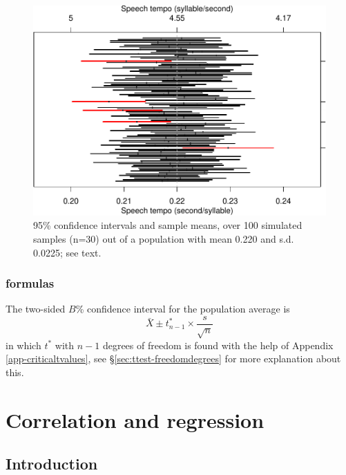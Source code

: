 \documentclass[
]{book}
\begin{document}
\begin{figure}
\centering
\includegraphics{QMS-EN_files/figure-latex/tempo95CIs-1.pdf}
\caption{\label{fig:tempo95CIs}95\% confidence intervals and sample means, over 100 simulated samples (n=30) out of a population with mean 0.220 and s.d. 0.0225; see text.}
\end{figure}

\hypertarget{formulas-2}{%
\subsection{formulas}\label{formulas-2}}

The two-sided \(B\)\% confidence interval for the population
average is
\begin{equation}
  \bar{X} \pm t^*_{n-1} \times \frac{s}{\sqrt{n}}
  \label{eq:t-onesampleCI}
\end{equation}
in which \(t^*\) with \(n-1\) degrees of freedom is found with the help of
Appendix \ref{app-criticaltvalues}, see
§\ref{sec:ttest-freedomdegrees} for more explanation about this.

\hypertarget{ch-correlation-regression}{%
\chapter{Correlation and regression}\label{ch-correlation-regression}}

\hypertarget{introduction-5}{%
\section{Introduction}\label{introduction-5}}
\end{document}
